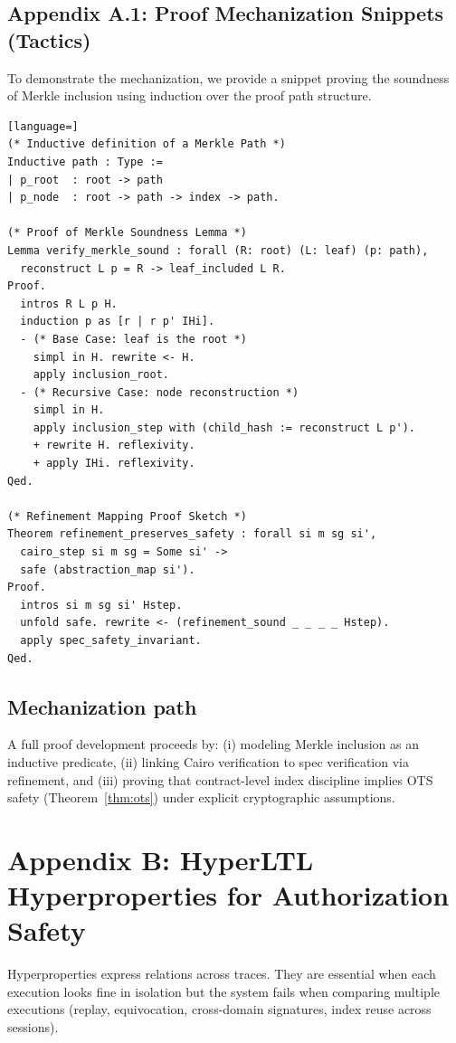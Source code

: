 \documentclass[conference]{IEEEtran}
\theoremstyle{definition}
\theoremstyle{plain}
\theoremstyle{remark}
\begin{document}
\subsection*{Appendix A.1: Proof Mechanization Snippets (Tactics)}
To demonstrate the mechanization, we provide a snippet proving the soundness of Merkle inclusion using induction over the proof path structure.

\begin{lstlisting}[language=]
(* Inductive definition of a Merkle Path *)
Inductive path : Type :=
| p_root  : root -> path
| p_node  : root -> path -> index -> path.

(* Proof of Merkle Soundness Lemma *)
Lemma verify_merkle_sound : forall (R: root) (L: leaf) (p: path),
  reconstruct L p = R -> leaf_included L R.
Proof.
  intros R L p H.
  induction p as [r | r p' IHi].
  - (* Base Case: leaf is the root *)
    simpl in H. rewrite <- H.
    apply inclusion_root.
  - (* Recursive Case: node reconstruction *)
    simpl in H.
    apply inclusion_step with (child_hash := reconstruct L p').
    + rewrite H. reflexivity.
    + apply IHi. reflexivity.
Qed.

(* Refinement Mapping Proof Sketch *)
Theorem refinement_preserves_safety : forall si m sg si',
  cairo_step si m sg = Some si' ->
  safe (abstraction_map si').
Proof.
  intros si m sg si' Hstep.
  unfold safe. rewrite <- (refinement_sound _ _ _ _ Hstep).
  apply spec_safety_invariant.
Qed.
\end{lstlisting}

\subsection*{Mechanization path}
A full proof development proceeds by: (i) modeling Merkle inclusion as an inductive predicate, (ii) linking Cairo verification to spec verification via refinement, and (iii) proving that contract-level index discipline implies OTS safety (Theorem~\ref{thm:ots}) under explicit cryptographic assumptions.

\section{Appendix B: HyperLTL Hyperproperties for Authorization Safety}
\label{app:hyperltl}
Hyperproperties express relations across traces. They are essential when each execution looks fine in isolation but the system fails when comparing multiple executions (replay, equivocation, cross-domain signatures, index reuse across sessions).
\end{document}
